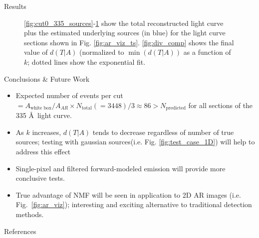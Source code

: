 \documentclass[final]{beamer}
\begin{document}
\begin{frame}{}
\begin{columns}[t]
\begin{column}{.32\linewidth}
\begin{block}{Results}
\begin{figure}
{			\label{fig:cut2_335_sources}}
			\caption{\footnotesize \ref{fig:cut0_335_sources}-\ref{fig:cut2_335_sources} show the total reconstructed light curve plus the estimated underlying sources (in blue) for the light curve sections shown in Fig. \ref{fig:ar_viz_ts}. \ref{fig:div_comp} shows the final value of $d(T|A)$ (normalized to $\min(d(T|A))$ as a function of $k$; dotted lines show the exponential fit.}
		\end{figure}
        \end{block}
		\begin{block}{Conclusions \& Future Work}
			\begin{itemize}
				\item Expected number of events per cut $=A_{\text{white box}}/A_{AR}\times N_{\text{total}}(=3448)/3\approx86>N_{\text{predicted}}$ for all sections of the 335 \AA~light curve.
				\item As $k$ increases, $d(T|A)$ tends to decrease regardless of number of true sources; testing with gaussian sources(i.e. Fig. \ref{fig:test_case_1D}) will help to address this effect
				\item Single-pixel and filtered forward-modeled emission \citep[see][]{warren_systematic_2012} will provide more conclusive tests.
				\item \alert{True advantage of NMF will be seen in application to 2D AR images} (i.e. Fig.~\ref{fig:ar_viz}); interesting and exciting alternative to traditional detection methods.
			\end{itemize}
			
		\end{block}
	  \begin{block}{References}
	  	\scriptsize
		
	  	
	  \end{block}
    \end{column}
	\end{columns}
\end{frame}
\end{document}
